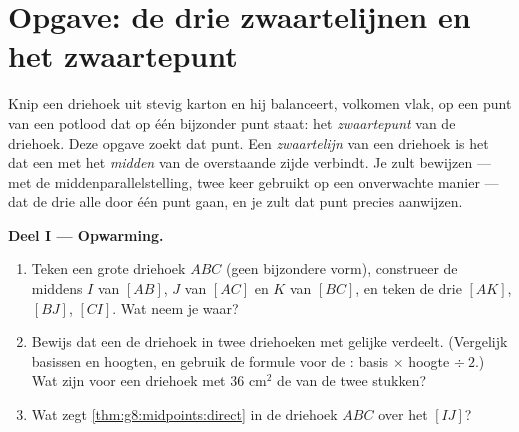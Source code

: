 \section{Opgave: de drie zwaartelijnen en het zwaartepunt}

\begin{problem}
\label{pb:g8:midpoints:1}
Knip een driehoek uit stevig karton en hij balanceert, volkomen vlak, op een
punt van een potlood dat op één bijzonder punt staat: het
\emph{zwaartepunt} van de driehoek. Deze opgave zoekt dat punt.
Een \emph{zwaartelijn} van een driehoek is het  dat een
 met het \emph{midden} van de overstaande zijde verbindt. Je zult
bewijzen --- met de middenparallelstelling, twee keer gebruikt op een onverwachte
manier --- dat de drie  alle door één punt gaan, en je zult dat punt
precies aanwijzen.

\medskip
\noindent\textbf{Deel I --- Opwarming.}
\begin{enumerate}
  \item Teken een grote driehoek $ABC$ (geen bijzondere vorm), construeer de
        middens $I$ van $[AB]$, $J$ van $[AC]$ en $K$ van $[BC]$, en teken de
        drie  $[AK]$, $[BJ]$, $[CI]$. Wat neem je waar?
  \item Bewijs dat een  de driehoek in twee driehoeken met gelijke
         verdeelt. (Vergelijk basissen en hoogten, en gebruik de
        formule voor de : basis $\times$ hoogte $\div\ 2$.) Wat zijn
        voor een driehoek met  $36$ cm$^2$ de  van de twee
        stukken?
  \item Wat zegt \cref{thm:g8:midpoints:direct} in de driehoek $ABC$ over het
         $[IJ]$?
\end{enumerate}


\end{problem}
